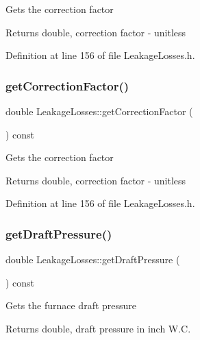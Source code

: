 Gets the correction factor \begin{DoxyReturn}{Returns}
double, correction factor -\/ unitless 
\end{DoxyReturn}


Definition at line 156 of file Leakage\+Losses.\+h.

\mbox{\label{class_leakage_losses_ad4f289a7490cd3fd4dfc4099fc4ad562}} 
\subsubsection{\texorpdfstring{get\+Correction\+Factor()}{getCorrectionFactor()}\hspace{0.1cm}{\footnotesize\ttfamily [3/3]}}
{\footnotesize\ttfamily double Leakage\+Losses\+::get\+Correction\+Factor (\begin{DoxyParamCaption}{ }\end{DoxyParamCaption}) const\hspace{0.3cm}{\ttfamily [inline]}}

Gets the correction factor \begin{DoxyReturn}{Returns}
double, correction factor -\/ unitless 
\end{DoxyReturn}


Definition at line 156 of file Leakage\+Losses.\+h.

\mbox{\label{class_leakage_losses_a0ec89fc6371c4a788e1bb861c7cfba35}} 
\subsubsection{\texorpdfstring{get\+Draft\+Pressure()}{getDraftPressure()}\hspace{0.1cm}{\footnotesize\ttfamily [1/3]}}
{\footnotesize\ttfamily double Leakage\+Losses\+::get\+Draft\+Pressure (\begin{DoxyParamCaption}{ }\end{DoxyParamCaption}) const\hspace{0.3cm}{\ttfamily [inline]}}

Gets the furnace draft pressure \begin{DoxyReturn}{Returns}
double, draft pressure in inch W.\+C. 
\end{DoxyReturn}


